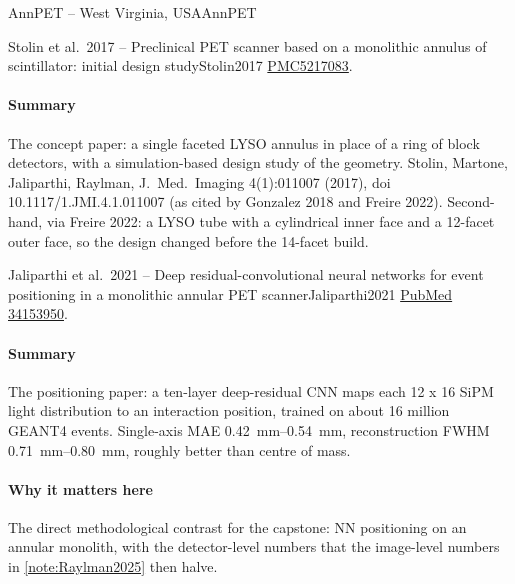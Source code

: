 \begin{programnote}{AnnPET -- West Virginia, USA}{AnnPET}
\begin{papernote}{Stolin et al.\ 2017 -- Preclinical PET scanner based on a monolithic annulus of scintillator: initial design study}{Stolin2017}
\href{https://pmc.ncbi.nlm.nih.gov/articles/PMC5217083/}{PMC5217083}.

\paragraph{Summary}
The concept paper: a single faceted LYSO annulus in place of a ring of block
detectors, with a simulation-based design study of the geometry.
Stolin, Martone, Jaliparthi, Raylman, J.\ Med.\ Imaging 4(1):011007 (2017),
doi 10.1117/1.JMI.4.1.011007 (as cited by Gonzalez 2018 and Freire 2022).
Second-hand, via Freire 2022: a LYSO tube with a  cylindrical inner face
and a 12-facet outer face, so the design changed before the 14-facet build.

\end{papernote}

\begin{papernote}{Jaliparthi et al.\ 2021 -- Deep residual-convolutional neural networks for event positioning in a monolithic annular PET scanner}{Jaliparthi2021}
\href{https://pubmed.ncbi.nlm.nih.gov/34153950/}{PubMed 34153950}.

\paragraph{Summary}
The positioning paper: a ten-layer deep-residual CNN maps each 12 x 16 SiPM
light distribution to an interaction position, trained on about 16 million
GEANT4 events. Single-axis MAE \qtyrange{0.42}{0.54}{\milli\metre},
reconstruction FWHM \qtyrange{0.71}{0.80}{\milli\metre}, roughly 
better than centre of mass.

\paragraph{Why it matters here}
The direct methodological contrast for the capstone: NN positioning on an
annular monolith, with the detector-level numbers that the image-level
numbers in \ref{note:Raylman2025} then halve.


\end{papernote}
\end{programnote}
